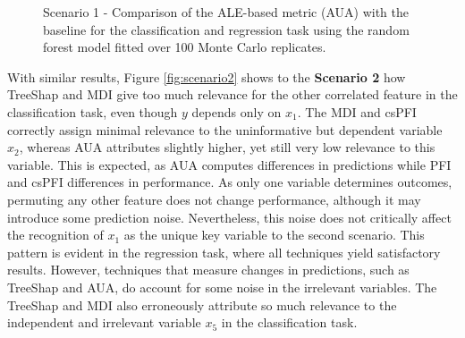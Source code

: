 \begin{figure}[ht!]
\centering
  \caption{Scenario 1 - Comparison of the ALE-based metric (AUA) with the baseline for the classification and regression task using the random forest model fitted over 100 Monte Carlo replicates.}
    \label{fig:chap5_1}
\end{figure}

With similar results, Figure \ref{fig:scenario2} shows to the \textbf{Scenario 2} how TreeShap and \gls{MDI} give too much relevance for the other correlated feature in the classification task, even though \(y\) depends only on \(x_1\). The \gls{MDI} and \gls{csPFI} correctly assign minimal relevance to the uninformative but dependent variable \(x_2\), whereas \gls{AUA} attributes slightly higher, yet still very low relevance to this variable. This is expected, as \gls{AUA} computes differences in predictions while \gls{PFI} and \gls{csPFI} differences in performance. As only one variable determines outcomes, permuting any other feature does not change performance, although it may introduce some prediction noise. Nevertheless, this noise does not critically affect the recognition of \(x_1\) as the unique key variable to the second scenario. This pattern is evident in the regression task, where all techniques yield satisfactory results. However, techniques that measure changes in predictions, such as TreeShap and \gls{AUA}, do account for some noise in the irrelevant variables. The TreeShap and \gls{MDI} also erroneously attribute so much relevance to the independent and irrelevant variable \(x_5\) in the classification task. 

